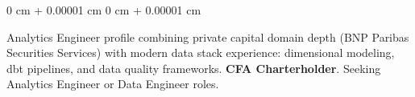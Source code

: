 \documentclass[10pt, letterpaper]{article}
\newenvironment{onecolentry}{
    \begin{adjustwidth}{
        0 cm + 0.00001 cm
    }{
        0 cm + 0.00001 cm
    }
}{
    \end{adjustwidth}
} %
\begin{document}
        \begin{onecolentry}
Analytics Engineer profile combining private capital domain depth (BNP Paribas Securities Services) with modern data stack experience: dimensional modeling, dbt pipelines, and data quality frameworks. \textbf{CFA Charterholder}. Seeking Analytics Engineer or Data Engineer roles.



        \end{onecolentry}

        \vspace{0.2 cm}
\end{document}

